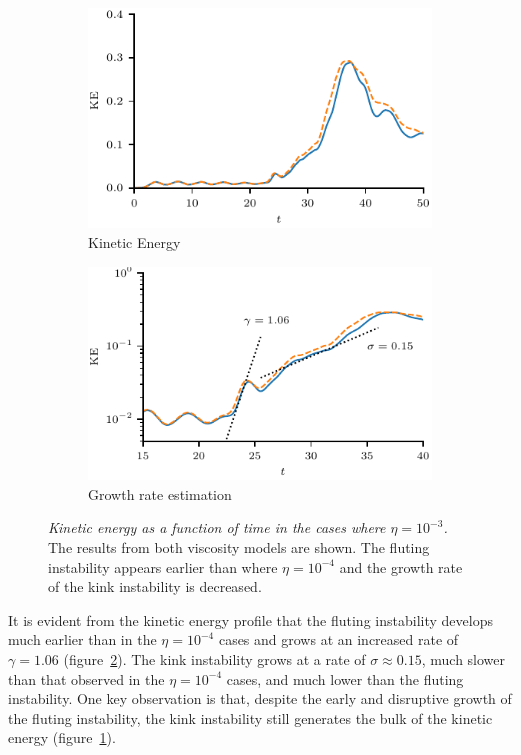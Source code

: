 \documentclass[12pt]{article}
\newcommand{\mycaption}[2]{\caption[#1]{\emph{#1} #2}}
\begin{document}
\begin{figure}[t]
  \centering
    \begin{subfigure}{0.49\textwidth}
      \includegraphics[width=\linewidth]{kinetic_energy-3.pdf}
      \caption{Kinetic Energy}
      \label{fig:kink_ke-3}
    \end{subfigure}
    \hfill
    \begin{subfigure}{0.49\textwidth}
      \includegraphics[width=\linewidth]{kinetic_energy_log-3.pdf}
      \caption{Growth rate estimation}
      \label{fig:kink_ke_log-3}
    \end{subfigure}
\mycaption{Kinetic energy as a function of time in the cases where $\eta=10^{-3}$.}{The results from both viscosity models are shown. The fluting instability appears earlier than where $\eta=10^{-4}$ and the growth rate of the kink instability is decreased.}
\label{fig:kink_str8_ke-3}%
\end{figure}

It is evident from the kinetic energy profile that the fluting instability develops much earlier than in the $\eta=10^{-4}$ cases and grows at an increased rate of $\gamma = 1.06$ (figure~\ref{fig:kink_ke_log-3}). The kink instability grows at a rate of $\sigma \approx 0.15$, much slower than that observed in the $\eta=10^{-4}$ cases, and much lower than the fluting instability. One key observation is that, despite the early and disruptive growth of the fluting instability, the kink instability still generates the bulk of the kinetic energy (figure~\ref{fig:kink_ke-3}).
\end{document}

